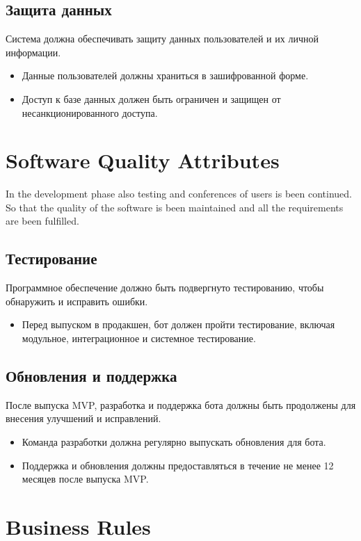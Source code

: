 \documentclass{scrreprt}
\begin{document}
\subsection{Защита данных}
Система должна обеспечивать защиту данных пользователей и их личной информации.
\begin{itemize}
    \item Данные пользователей должны храниться в зашифрованной форме.
    \item Доступ к базе данных должен быть ограничен и защищен от несанкционированного доступа.
\end{itemize}

\section{Software Quality Attributes}
In the development phase also testing and conferences of users is been continued. So that the quality of the software is been maintained and all the requirements are been fulfilled.

\subsection{Тестирование}
Программное обеспечение должно быть подвергнуто тестированию, чтобы обнаружить и исправить ошибки.
\begin{itemize}
    \item Перед выпуском в продакшен, бот должен пройти тестирование, включая модульное, интеграционное и системное тестирование.
\end{itemize}

\subsection{Обновления и поддержка}
После выпуска MVP, разработка и поддержка бота должны быть продолжены для внесения улучшений и исправлений.
\begin{itemize}
    \item Команда разработки должна регулярно выпускать обновления для бота.
    \item Поддержка и обновления должны предоставляться в течение не менее 12 месяцев после выпуска MVP.
\end{itemize}

\section{Business Rules}
\end{document}
